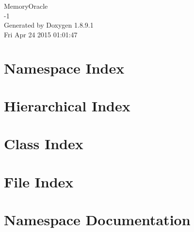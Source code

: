 \documentclass[twoside]{book}
\newcommand{\+}{\discretionary{\mbox{\scriptsize$\hookleftarrow$}}{}{}}
\newcommand{\clearemptydoublepage}{%
  \newpage{\pagestyle{empty}\cleardoublepage}%
}
\begin{document}
\hypersetup{pageanchor=false,
             bookmarks=true,
             bookmarksnumbered=true,
             pdfencoding=unicode
            }
\begin{titlepage}
\vspace*{7cm}
\begin{center}%
{\Large Memory\+Oracle \\[1ex]\large -\/1 }\\
\vspace*{1cm}
{\large Generated by Doxygen 1.8.9.1}\\
\vspace*{0.5cm}
{\small Fri Apr 24 2015 01:01:47}\\
\end{center}
\end{titlepage}
\clearemptydoublepage
\tableofcontents
\clearemptydoublepage
{}
\hypersetup{pageanchor=true}

\chapter{Namespace Index}

\chapter{Hierarchical Index}

\chapter{Class Index}

\chapter{File Index}

\chapter{Namespace Documentation}

























\end{document}
